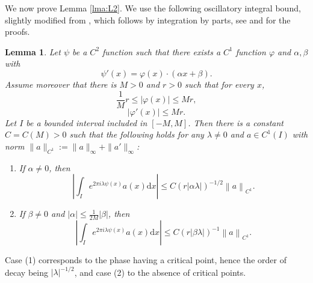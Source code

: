 \documentclass[12pt]{amsart}
\newcommand*\abs[1]{
	\left|#1\right|
}
\newcommand*\deriv{
	\mathrm{d}
}
\newcommand{\norm}[1]{\left\lVert#1\right\rVert}
\newtheorem{lem}{Lemma}[section]
\theoremstyle{definition}
\renewcommand{\leq}{\leqslant}
\renewcommand{\geq}{\geqslant}
\begin{document}
We now prove Lemma \ref{lma:L2}. We use the following oscillatory integral bound, slightly modified from \cite[Lemma 6.4]{JS}, which follows by integration by parts, see \cite[Section 4]{Kaufman} and \cite[Lemma 6.4]{JS} for the proofs.
\begin{lem}
\label{lem:oscillatory-integral-bound}
Let $\psi$ be a $C^2$ function such that there exists a $C^1$ function $\varphi$ and $\alpha, \beta$ with
\[\psi'(x) = \varphi(x)\cdot(\alpha x + \beta).\]
Assume moreover that there is $M > 0$ and $r > 0$ such that for every $x$,
\[\frac{1}{M}r \leq \abs{\varphi(x)} \leq Mr,\]
\[\abs{\varphi'(x)} \leq Mr.\]
Let $I$ be a bounded interval included in $[-M, M]$. Then there is a constant $C = C(M) > 0$ such that the following holds for any $\lambda \neq 0$ and $a \in C^1(I)$ with norm $\|a\|_{C^1} := \|a\|_\infty+\|a'\|_\infty$:
\begin{enumerate}
\item If $\alpha \neq 0$, then
\[\abs{\int_I e^{2\pi i\lambda \psi(x)}a(x)\deriv x} \leq C\left(r\abs{\alpha\lambda}\right)^{-1/2}\norm{a}_{C^1}.\]
\item If $\beta \neq 0$ and $\abs{\alpha} \leq \frac{1}{2M}\abs{\beta}$, then
\[\abs{\int_I e^{2\pi i\lambda \psi(x)}a(x)\deriv x }\leq C\left(r\abs{\beta\lambda}\right)^{-1}\norm{a}_{C^1}.\]
\end{enumerate}
\end{lem}
Case (1) corresponds to the phase having a critical point, hence the order of decay being $\abs{\lambda}^{-1/2}$, and case (2) to the absence of critical points.

\end{document}
